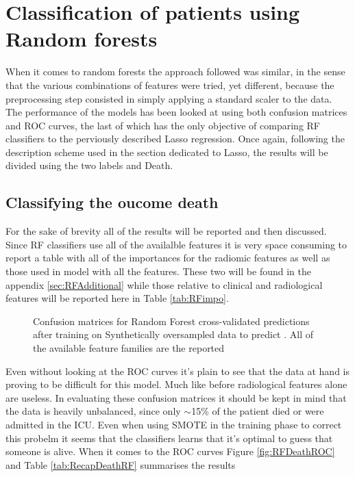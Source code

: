 \section{Classification of patients using Random forests}
When it comes to random forests the approach followed was similar, in the sense that the various combinations of features were tried, yet different, because the preprocessing step consisted in simply applying a standard scaler to the data. The performance of the models has been looked at using both confusion matrices and ROC curves, the last of which has the only objective of comparing RF classifiers to the perviously described Lasso regression. Once again, following the description scheme used in the section dedicated to Lasso, the results will be divided using the two labels \icu and Death.

\subsection{Classifying the oucome death}
For the sake of brevity all of the results will be reported and then discussed. Since RF classifiers use all of the availalble features it is very space consuming to report a table with all of the importances for the radiomic features as well as those used in model with all the features. These two will be found in the appendix \ref{sec:RFAdditional} while those relative to clinical and radiological features will be reported here in Table \ref{tab:RFimpo}.

\begin{figure}[H]
\centering
	\newline
        \caption{Confusion matrices for Random Forest cross-validated predictions after training on Synthetically oversampled data to predict \death. All of the available feature families are the reported}\label{fig:RFDeath}
\end{figure}

Even without looking at the ROC curves it's plain to see that the data at hand is proving to be difficult for this model. Much like before radiological features alone are useless. In evaluating these confusion matrices it should be kept in mind that the data is heavily unbalanced, since only $\sim$15\% of the patient died or were admitted in the ICU. Even when using SMOTE in the training phase to correct this probelm it seems that the classifiers learns that it's optimal to guess that someone is alive. When it comes to the ROC curves Figure \ref{fig:RFDeathROC} and Table \ref{tab:RecapDeathRF} summarises the results

